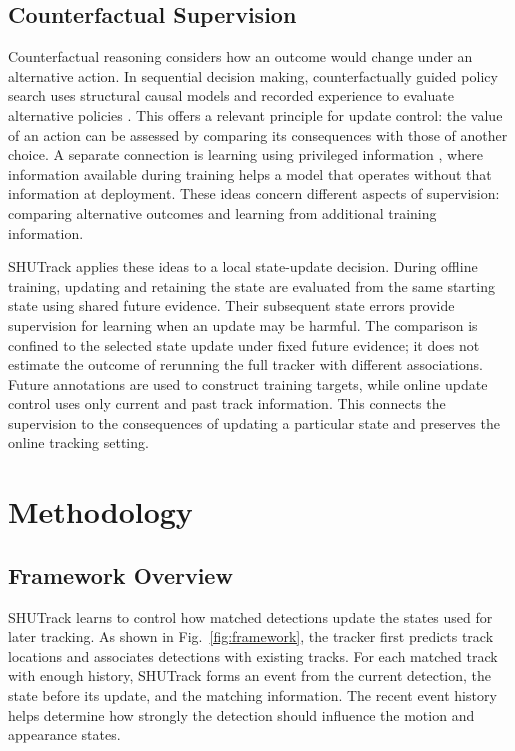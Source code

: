 \documentclass[a4paper,fleqn]{cas-sc}
\begin{document}
\subsection{Counterfactual Supervision}
Counterfactual reasoning considers how an outcome would change under an alternative action. In sequential decision making, counterfactually guided policy search uses structural causal models and recorded experience to evaluate alternative policies \cite{buesing2018woulda}. This offers a relevant principle for update control: the value of an action can be assessed by comparing its consequences with those of another choice. A separate connection is learning using privileged information \cite{vapnik2009new}, where information available during training helps a model that operates without that information at deployment. These ideas concern different aspects of supervision: comparing alternative outcomes and learning from additional training information.

SHUTrack applies these ideas to a local state-update decision. During offline training, updating and retaining the state are evaluated from the same starting state using shared future evidence. Their subsequent state errors provide supervision for learning when an update may be harmful. The comparison is confined to the selected state update under fixed future evidence; it does not estimate the outcome of rerunning the full tracker with different associations. Future annotations are used to construct training targets, while online update control uses only current and past track information. This connects the supervision to the consequences of updating a particular state and preserves the online tracking setting.

\section{Methodology}
\subsection{Framework Overview}
SHUTrack learns to control how matched detections update the states used for later tracking. As shown in Fig.~\ref{fig:framework}, the tracker first predicts track locations and associates detections with existing tracks. For each matched track with enough history, SHUTrack forms an event from the current detection, the state before its update, and the matching information. The recent event history helps determine how strongly the detection should influence the motion and appearance states.
\end{document}
